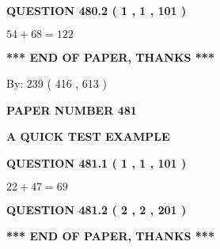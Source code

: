\documentclass[12pt]{article}
\begin{document}
  
  
\vspace{0.2in}
  
{\textbf{\Large{QUESTION
480.2 
 ( 1 , 1 , 101 )
}}}
  
  
 
 

$ %
54 +  %
68=   %
122$
 
 
   
   
 \vspace{0.2in}
 
   
   
   
   
\vspace{1.0in} 
{\textbf{\large{ *** END OF PAPER, THANKS *** }}} 
   
   
\hspace{1.0in} By: 
 239 ( 416 ,  613 )
   
   
   
   
\newpage 
\setcounter{page}{ 
   481001 } 
   
   
   
   
 {\textbf{ \Large{ PAPER NUMBER  481  }}}
   
   
\vspace{0.2in}
   
   
   
   
   
   
 \vspace{0.2in}
{\LARGE {\textbf{ A QUICK TEST EXAMPLE}}}
   
   
  
\vspace{0.2in}
  
{\textbf{\Large{QUESTION
481.1 
 ( 1 , 1 , 101 )
}}}
  
  
 
 

$ %
22 +  %
47=   %
69$
 
 
  
\vspace{0.2in}
  
{\textbf{\Large{QUESTION
481.2 
 ( 2 , 2 , 201 )
}}}
  
  
   
   
 \vspace{0.2in}
 
   
   
   
   
\vspace{1.0in} 
{\textbf{\large{ *** END OF PAPER, THANKS *** }}} 
   
\end{document}
